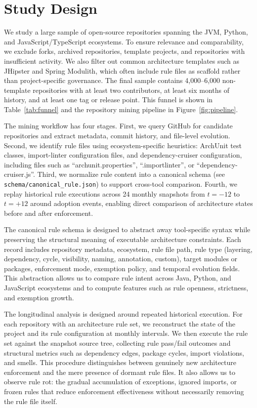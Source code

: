 \section{Study Design}\label{sec:study_design}

We study a large sample of open-source repositories spanning the JVM, Python, and JavaScript/TypeScript ecosystems. To ensure relevance and comparability, we exclude forks, archived repositories, template projects, and repositories with insufficient activity. We also filter out common architecture templates such as JHipster and Spring Modulith, which often include rule files as scaffold rather than project-specific governance. The final sample contains 4,000--6,000 non-template repositories with at least two contributors, at least six months of history, and at least one tag or release point. This funnel is shown in Table~\ref{tab:funnel} and the repository mining pipeline in Figure~\ref{fig:pipeline}.

The mining workflow has four stages. First, we query GitHub for candidate repositories and extract metadata, commit history, and file-level evolution. Second, we identify rule files using ecosystem-specific heuristics: ArchUnit test classes, import-linter configuration files, and dependency-cruiser configuration, including files such as ``archunit.properties'', ``.importlinter'', or ``dependency-cruiser.js''. Third, we normalize rule content into a canonical schema (see \texttt{schema/canonical\_rule.json}) to support cross-tool comparison. Fourth, we replay historical rule executions across 24 monthly snapshots from $t=-12$ to $t=+12$ around adoption events, enabling direct comparison of architecture states before and after enforcement.

The canonical rule schema is designed to abstract away tool-specific syntax while preserving the structural meaning of executable architecture constraints. Each record includes repository metadata, ecosystem, rule file path, rule type (layering, dependency, cycle, visibility, naming, annotation, custom), target modules or packages, enforcement mode, exemption policy, and temporal evolution fields. This abstraction allows us to compare rule intent across Java, Python, and JavaScript ecosystems and to compute features such as rule openness, strictness, and exemption growth.

The longitudinal analysis is designed around repeated historical execution. For each repository with an architecture rule set, we reconstruct the state of the project and its rule configuration at monthly intervals. We then execute the rule set against the snapshot source tree, collecting rule pass/fail outcomes and structural metrics such as dependency edges, package cycles, import violations, and smells. This procedure distinguishes between genuinely new architecture enforcement and the mere presence of dormant rule files. It also allows us to observe rule rot: the gradual accumulation of exceptions, ignored imports, or frozen rules that reduce enforcement effectiveness without necessarily removing the rule file itself.

